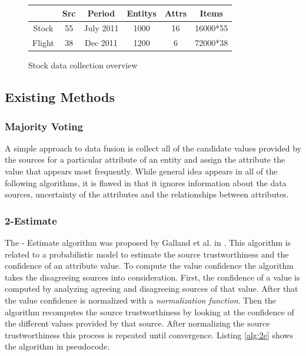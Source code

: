 \documentclass{acm_proc_article-sp}
\begin{document}
\begin{figure}[h]
    \centering
{%
\begin{tabular}{  | c | c | c | c  | c | c |}		
\hline
\textbf{} & \textbf{Src} & \textbf{Period} & \textbf{Entitys} & \textbf{Attrs}  & \textbf{Items}  \\
\hline
 Stock & 55 & July 2011 &  1000 & 16 &  16000*55   \\
 Flight & 38 & Dec 2011 &  1200 & 6 &  72000*38   \\
\hline
\end{tabular}
}
 \caption{Stock data collection overview}%
    \label{fig:stock}%
\end{figure}

\subsection{Existing Methods}

\subsubsection{Majority Voting}

A simple approach to data fusion is collect all of the candidate values provided by the sources for a particular attribute of an entity and assign the attribute the value that appears most frequently. While general idea appears in all of the following   algorithms,  it is flawed in that it ignores information about the data sources, uncertainty of the attributes and the relationships between  attributes.


\subsubsection{2-Estimate}
The {- Estimate} algorithm was proposed by Galland et al. in \cite{galland:corro}. This algorithm is related to a probabilistic model to estimate the source trustworthiness and the confidence of an attribute value. To compute the value confidence the algorithm takes the disagreeing sources into consideration. First, the confidence of a value is computed by analyzing agreeing and disagreeing sources of that value. After that the value confidence is normalized with a \emph{normalization function}. Then the algorithm recomputes the source trustworthiness by looking at the confidence of the different values provided by that source. After normalizing the source trustworthiness this process is repeated until convergence. Listing \ref{alg:2e} shows the algorithm in pseudocode.
\end{document}
